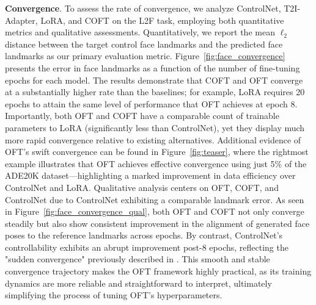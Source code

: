 \textbf{Convergence}. To assess the rate of convergence, we analyze ControlNet, T2I-Adapter, LoRA, and COFT on the L2F task, employing both quantitative metrics and qualitative assessments. Quantitatively, we report the mean $\ell_2$ distance between the target control face landmarks and the predicted face landmarks as our primary evaluation metric. Figure~\ref{fig:face_convergence} presents the error in face landmarks as a function of the number of fine-tuning epochs for each model. The results demonstrate that COFT and OFT converge at a substantially higher rate than the baselines; for example, LoRA requires 20 epochs to attain the same level of performance that OFT achieves at epoch 8. Importantly, both OFT and COFT have a comparable count of trainable parameters to LoRA (significantly less than ControlNet), yet they display much more rapid convergence relative to existing alternatives. Additional evidence of OFT's swift convergence can be found in Figure~\ref{fig:teaser}, where the rightmost example illustrates that OFT achieves effective convergence using just 5\% of the ADE20K dataset—highlighting a marked improvement in data efficiency over ControlNet and LoRA. Qualitative analysis centers on OFT, COFT, and ControlNet due to ControlNet exhibiting a comparable landmark error. As seen in Figure~\ref{fig:face_convergence_qual}, both OFT and COFT not only converge steadily but also show consistent improvement in the alignment of generated face poses to the reference landmarks across epochs. By contrast, ControlNet's controllability exhibits an abrupt improvement post-8 epochs, reflecting the "sudden convergence" previously described in \cite{zhang2023adding}. This smooth and stable convergence trajectory makes the OFT framework highly practical, as its training dynamics are more reliable and straightforward to interpret, ultimately simplifying the process of tuning OFT’s hyperparameters.

